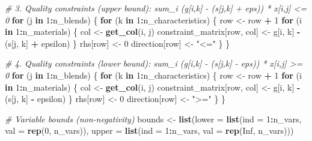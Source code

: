 \documentclass[
]{article}
\newenvironment{Shaded}{\begin{snugshade}}{\end{snugshade}}
\newcommand{\AttributeTok}[1]{\textcolor[rgb]{0.13,0.29,0.53}{#1}}
\newcommand{\CommentTok}[1]{\textcolor[rgb]{0.56,0.35,0.01}{\textit{#1}}}
\newcommand{\ConstantTok}[1]{\textcolor[rgb]{0.56,0.35,0.01}{#1}}
\newcommand{\ControlFlowTok}[1]{\textcolor[rgb]{0.13,0.29,0.53}{\textbf{#1}}}
\newcommand{\DecValTok}[1]{\textcolor[rgb]{0.00,0.00,0.81}{#1}}
\newcommand{\FunctionTok}[1]{\textcolor[rgb]{0.13,0.29,0.53}{\textbf{#1}}}
\newcommand{\NormalTok}[1]{#1}
\newcommand{\OtherTok}[1]{\textcolor[rgb]{0.56,0.35,0.01}{#1}}
\newcommand{\SpecialCharTok}[1]{\textcolor[rgb]{0.81,0.36,0.00}{\textbf{#1}}}
\newcommand{\StringTok}[1]{\textcolor[rgb]{0.31,0.60,0.02}{#1}}
\begin{document}
\begin{Shaded}
\begin{Highlighting}[]
\CommentTok{\# 3. Quality constraints (upper bound): sum\_i (g[i,k] {-} (s[j,k] + eps)) * x[i,j] \textless{}= 0}
\ControlFlowTok{for}\NormalTok{ (j }\ControlFlowTok{in} \DecValTok{1}\SpecialCharTok{:}\NormalTok{n\_blends) \{}
  \ControlFlowTok{for}\NormalTok{ (k }\ControlFlowTok{in} \DecValTok{1}\SpecialCharTok{:}\NormalTok{n\_characteristics) \{}
\NormalTok{    row }\OtherTok{\textless{}{-}}\NormalTok{ row }\SpecialCharTok{+} \DecValTok{1}
    \ControlFlowTok{for}\NormalTok{ (i }\ControlFlowTok{in} \DecValTok{1}\SpecialCharTok{:}\NormalTok{n\_materials) \{}
\NormalTok{      col }\OtherTok{\textless{}{-}} \FunctionTok{get\_col}\NormalTok{(i, j)}
\NormalTok{      constraint\_matrix[row, col] }\OtherTok{\textless{}{-}}\NormalTok{ g[i, k] }\SpecialCharTok{{-}}\NormalTok{ (s[j, k] }\SpecialCharTok{+}\NormalTok{ epsilon)}
\NormalTok{    \}}
\NormalTok{    rhs[row] }\OtherTok{\textless{}{-}} \DecValTok{0}
\NormalTok{    direction[row] }\OtherTok{\textless{}{-}} \StringTok{"\textless{}="}
\NormalTok{  \}}
\NormalTok{\}}

\CommentTok{\# 4. Quality constraints (lower bound): sum\_i (g[i,k] {-} (s[j,k] {-} eps)) * x[i,j] \textgreater{}= 0}
\ControlFlowTok{for}\NormalTok{ (j }\ControlFlowTok{in} \DecValTok{1}\SpecialCharTok{:}\NormalTok{n\_blends) \{}
  \ControlFlowTok{for}\NormalTok{ (k }\ControlFlowTok{in} \DecValTok{1}\SpecialCharTok{:}\NormalTok{n\_characteristics) \{}
\NormalTok{    row }\OtherTok{\textless{}{-}}\NormalTok{ row }\SpecialCharTok{+} \DecValTok{1}
    \ControlFlowTok{for}\NormalTok{ (i }\ControlFlowTok{in} \DecValTok{1}\SpecialCharTok{:}\NormalTok{n\_materials) \{}
\NormalTok{      col }\OtherTok{\textless{}{-}} \FunctionTok{get\_col}\NormalTok{(i, j)}
\NormalTok{      constraint\_matrix[row, col] }\OtherTok{\textless{}{-}}\NormalTok{ g[i, k] }\SpecialCharTok{{-}}\NormalTok{ (s[j, k] }\SpecialCharTok{{-}}\NormalTok{ epsilon)}
\NormalTok{    \}}
\NormalTok{    rhs[row] }\OtherTok{\textless{}{-}} \DecValTok{0}
\NormalTok{    direction[row] }\OtherTok{\textless{}{-}} \StringTok{"\textgreater{}="}
\NormalTok{  \}}
\NormalTok{\}}

\CommentTok{\# Variable bounds (non{-}negativity)}
\NormalTok{bounds }\OtherTok{\textless{}{-}} \FunctionTok{list}\NormalTok{(}\AttributeTok{lower =} \FunctionTok{list}\NormalTok{(}\AttributeTok{ind =} \DecValTok{1}\SpecialCharTok{:}\NormalTok{n\_vars, }\AttributeTok{val =} \FunctionTok{rep}\NormalTok{(}\DecValTok{0}\NormalTok{, n\_vars)),}
                \AttributeTok{upper =} \FunctionTok{list}\NormalTok{(}\AttributeTok{ind =} \DecValTok{1}\SpecialCharTok{:}\NormalTok{n\_vars, }\AttributeTok{val =} \FunctionTok{rep}\NormalTok{(}\ConstantTok{Inf}\NormalTok{, n\_vars)))}


\end{Highlighting}
\end{Shaded}
\end{document}
